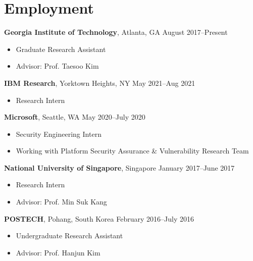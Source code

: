 \section*{Employment}

\begin{description}
\item {\bf Georgia Institute of Technology}, Atlanta, GA \dotfill August 2017--Present
  \begin{itemize}
      \item Graduate Research Assistant
  \item Advisor: Prof. Taesoo Kim
  \end{itemize}

\item {\bf IBM Research}, Yorktown Heights, NY \dotfill May 2021--Aug 2021
  \begin{itemize}
      \item Research Intern
  \end{itemize}

\item {\bf Microsoft}, Seattle, WA \dotfill May 2020--July 2020
  \begin{itemize}
      \item Security Engineering Intern
      \item Working with Platform Security Assurance \& Vulnerability Research Team
  \end{itemize}

  
\item {\bf National University of Singapore}, Singapore \dotfill January 2017--June 2017
  \begin{itemize}
  \item Research Intern
  \item Advisor: Prof. Min Suk Kang
  \end{itemize}

\item {\bf POSTECH}, Pohang, South Korea \dotfill February 2016--July 2016
  \begin{itemize}
  \item Undergraduate Research Assistant
  \item Advisor: Prof. Hanjun Kim
  \end{itemize}
\end{description}
